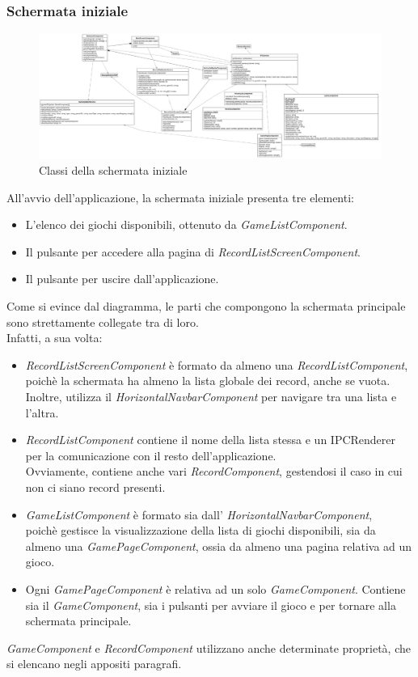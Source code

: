 \subsubsection{Schermata iniziale}
\begin{figure}[h]
    \centering
    \includegraphics[width=340pt]{ProgettazioneTecnica/MainScreen.png}
    \caption{Classi della schermata iniziale}
    \label{fig:schermataIniziale}
\end{figure}
All'avvio dell'applicazione, la schermata iniziale presenta tre elementi:
\begin{itemize}
    \item L'elenco dei giochi disponibili, ottenuto da \emph{GameListComponent}.
    \item Il pulsante per accedere alla pagina di \emph{RecordListScreenComponent}.
    \item Il pulsante per uscire dall'applicazione.
\end{itemize}
Come si evince dal diagramma, le parti che compongono la schermata principale sono strettamente collegate tra di loro.\\
Infatti, a sua volta:
\begin{itemize}
    \item \emph{RecordListScreenComponent} è formato da almeno una \emph{RecordListComponent}, poichè la schermata ha almeno la lista globale dei record, anche se vuota. Inoltre, utilizza il \emph{HorizontalNavbarComponent} per navigare tra una lista e l'altra.
    \item \emph{RecordListComponent} contiene il nome della lista stessa e un IPCRenderer per la comunicazione con il resto dell'applicazione.\\ Ovviamente, contiene anche vari \emph{RecordComponent}, gestendosi il caso in cui non ci siano record presenti.
    \item \emph{GameListComponent} è formato sia dall' \emph{HorizontalNavbarComponent},\\ poichè gestisce la visualizzazione della lista di giochi disponibili, sia da almeno una \emph{GamePageComponent}, ossia da almeno una pagina relativa ad un gioco.
    \item Ogni \emph{GamePageComponent} è relativa ad un solo \emph{GameComponent}. Contiene sia il \emph{GameComponent}, sia i pulsanti per avviare il gioco e per tornare alla schermata principale.
\end{itemize}
\emph{GameComponent} e \emph{RecordComponent} utilizzano anche determinate proprietà, che si elencano negli appositi paragrafi.
